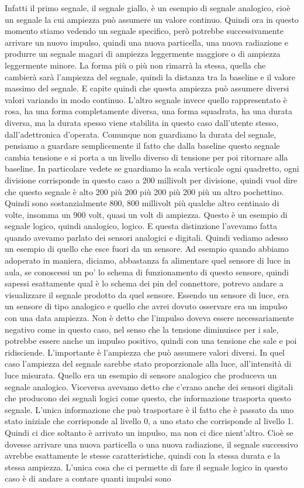 Infatti il primo segnale, il segnale giallo, è un esempio di segnale analogico, cioè un segnale la cui ampiezza può assumere un valore continuo. Quindi ora in questo momento stiamo vedendo un segnale specifico, però potrebbe successivamente arrivare un nuovo impulso, quindi una nuova particella, una nuova radiazione e produrre un segnale magari di ampiezza leggermente maggiore o di ampiezza leggermente minore. La forma più o più non rimarrà la stessa, quella che cambierà sarà l'ampiezza del segnale, quindi la distanza tra la baseline e il valore massimo del segnale. E capite quindi che questa ampiezza può assumere diversi valori variando in modo continuo. L'altro segnale invece quello rappresentato è rosa, ha una forma completamente diversa, una forma squadrata, ha una durata diversa, ma la durata spesso viene stabilita in questo caso dall'utente stesso, dall'adettronica d'operata. Comunque non guardiamo la durata del segnale, pensiamo a guardare semplicemente il fatto che dalla baseline questo segnale cambia tensione e si porta a un livello diverso di tensione per poi ritornare alla baseline. In particolare vedete se guardiamo la scala verticale ogni quadretto, ogni divisione corrisponde in questo caso a 200 millivolt per divisione, quindi vuol dire che questo segnale è alto 200 più 200 più 200 più 200 più un altro pochettino. Quindi sono sostanzialmente 800, 800 millivolt più qualche altro centinaio di volte, insomma un 900 volt, quasi un volt di ampiezza. Questo è un esempio di segnale logico, quindi analogico, logico. E questa distinzione l'avevamo fatta quando avevamo parlato dei sensori analogici e digitali. Quindi vediamo adesso un esempio di quello che esce fuori da un sensore. Ad esempio quando abbiamo adoperato in maniera, diciamo, abbastanza fa alimentare quel sensore di luce in aula, se conoscessi un po' lo schema di funzionamento di questo sensore, quindi sapessi esattamente qual è lo schema dei pin del connettore, potrevo andare a visualizzare il segnale prodotto da quel sensore. Essendo un sensore di luce, era un sensore di tipo analogico e quello che avrei dovuto osservare era un impulso con una data ampiezza. Non è detto che l'impulso doveva essere necessariamente negativo come in questo caso, nel senso che la tensione diminuisce per i sale, potrebbe essere anche un impulso positivo, quindi con una tensione che sale e poi ridisciende. L'importante è l'ampiezza che può assumere valori diversi. In quel caso l'ampiezza del segnale sarebbe stato proporzionale alla luce, all'intensità di luce misurata. Quello era un esempio di sensore analogico che produceva un segnale analogico. Viceversa avevamo detto che c'erano anche dei sensori digitali che producono dei segnali logici come questo, che informazione trasporta questo segnale. L'unica informazione che può trasportare è il fatto che è passato da uno stato iniziale che corrisponde al livello 0, a uno stato che corrisponde al livello 1. Quindi ci dice soltanto è arrivato un impulso, ma non ci dice nient'altro. Cioè se dovesse arrivare una nuova particella o una nuova radiazione, il segnale successivo avrebbe esattamente le stesse caratteristiche, quindi con la stessa durata e la stessa ampiezza. L'unica cosa che ci permette di fare il segnale logico in questo caso è di andare a contare quanti impulsi sono 